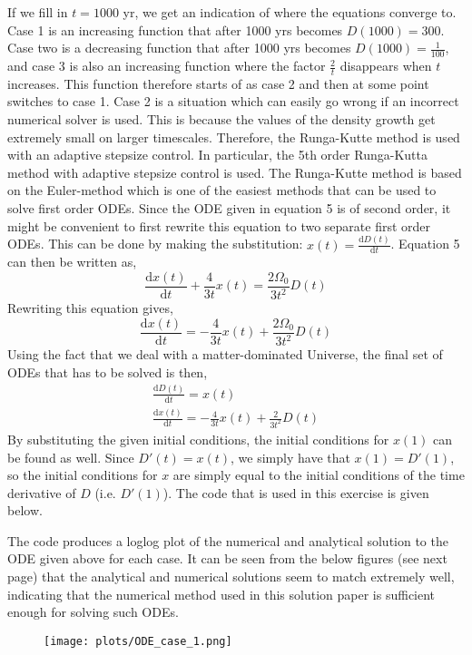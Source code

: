 If we fill in $t = 1000$ yr, we get an indication of where the equations converge to. Case 1 is an increasing function that after 1000 yrs becomes $D(1000) = 300$. Case two is a decreasing function that after 1000 yrs becomes $D(1000) = \frac{1}{100}$, and case 3 is also an increasing function where the factor $\frac{2}{t}$ disappears when $t$ increases. This function therefore starts of as case 2 and then at some point switches to case 1. Case 2 is a situation which can easily go wrong if an incorrect numerical solver is used. This is because the values of the density growth get extremely small on larger timescales. Therefore, the Runga-Kutte method is used with an adaptive stepsize control. In particular, the 5th order Runga-Kutta method with adaptive stepsize control is used. The Runga-Kutte method is based on the Euler-method which is one of the easiest methods that can be used to solve first order ODEs.
Since the ODE given in equation 5 is of second order, it might be convenient to first rewrite this equation to two separate first order ODEs. This can be done by making the substitution: $x(t) = \frac{\mathrm{d}D(t)}{\mathrm{d}t}$. Equation 5 can then be written as,
\begin{equation*}
\frac{\mathrm{d}x(t)}{\mathrm{d}t} + \frac{4}{3t}x(t) = \frac{2\Omega_0}{3t^2} D(t)
\end{equation*}
Rewriting this equation gives,
\begin{equation*}
\frac{\mathrm{d}x(t)}{\mathrm{d}t} = -\frac{4}{3t}x(t) + \frac{2\Omega_0}{3t^2} D(t)
\end{equation*}
Using the fact that we deal with a matter-dominated Universe, the final set of ODEs that has to be solved is then,
\begin{gather}
\frac{\mathrm{d}D(t)}{\mathrm{d}t} = x(t)\\
\frac{\mathrm{d}x(t)}{\mathrm{d}t} = -\frac{4}{3t}x(t) + \frac{2}{3t^2} D(t)
\end{gather}
By substituting the given initial conditions, the initial conditions for $x(1)$ can be found as well. Since $D'(t) = x(t)$, we simply have that $x(1) = D'(1)$, so the initial conditions for $x$ are simply equal to the initial conditions of the time derivative of $D$ (i.e. $D'(1)$). 
 The code that is used in this exercise is given below.

The code produces a loglog plot of the numerical and analytical solution to the ODE given above for each case. It can be seen from the below figures (see next page) that the analytical and numerical solutions seem to match extremely well, indicating that the numerical method used in this solution paper is sufficient enough for solving such ODEs.
\begin{figure}[h]
\vspace{-1em}
\centering
\texttt{[image: plots/ODE\_case\_1.png]}
\end{figure} 


